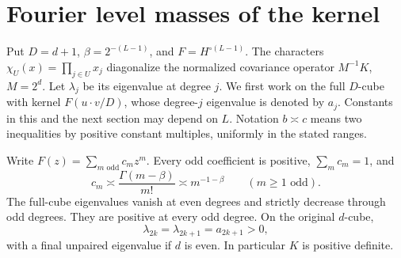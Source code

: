 \section{Fourier level masses of the kernel}
Put $D=d+1$, $\beta=2^{-(L-1)}$, and $F=H^{\circ(L-1)}$.
The characters $\chi_U(x)=\prod_{j\in U}x_j$ diagonalize the
normalized covariance operator $M^{-1}K$, $M=2^d$. Let $\lambda_j$
be its eigenvalue at degree $j$. We first work on the full $D$-cube
with kernel $F(u\cdot v/D)$, whose degree-$j$ eigenvalue is denoted
by $a_j$. Constants in this and the next section may depend on $L$.
Notation $b\asymp c$ means two inequalities by positive constant
multiples, uniformly in the stated ranges.

\begin{lemma}\label{lem:power}
Write $F(z)=\sum_{m\text{ odd}}c_mz^m$. Every odd coefficient is
positive, $\sum_m c_m=1$, and
\[
 c_m\asymp\frac{\Gamma(m-\beta)}{m!}\asymp m^{-1-\beta}
 \qquad(m\ge1\text{ odd}).
\]
The full-cube eigenvalues vanish at even degrees and strictly decrease
through odd degrees. They are positive at every odd degree. On the
original $d$-cube,
\[
 \lambda_{2k}=\lambda_{2k+1}=a_{2k+1}>0,
\]
with a final unpaired eigenvalue if $d$ is even. In particular $K$
is positive definite.
\end{lemma}
